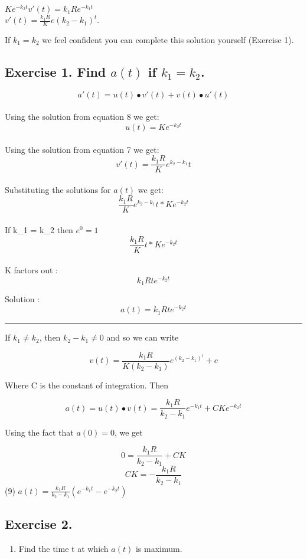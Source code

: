 \documentclass[]{article}
\providecommand{\tightlist}{%
  \setlength{\itemsep}{0pt}\setlength{\parskip}{0pt}}
\begin{document}
\(Ke^{-k_2t}v'(t) = k_1Re^{-k_1t}\)\\
\(v'(t) = \frac{k_1R}{K}e(k_2-k_1)^t\).

If \(k_1 = k_2\) we feel confident you can complete this solution
yourself (Exercise 1).

\subsection{\texorpdfstring{Exercise 1. Find \(a(t)\) if
\(k_1 = k_2\).}{Exercise 1. Find a(t) if k\_1 = k\_2.}}\label{exercise-1.-find-at-if-k_1-k_2.}

\[a'(t) = u(t) \bullet v'(t) + v(t) \bullet u'(t)\]\\
Using the solution from equation 8 we get: \[u(t) = Ke^{-k_2t}\]\\
Using the solution from equation 7 we get:
\[v'(t) = \frac{k_1R}{K}e^{k_2 - k_1}t\]\\
Substituting the solutions for \(a(t)\) we get:
\[\frac{k_1R}{K}e^{k_2 - k_1}t * Ke^{-k_2t}\]\\
If k\_1 = k\_2 then \(e^{0} = 1\)\\
\[\frac{k_1R}{K}t * Ke^{-k_2t}\]\\
K factors out : \[k_1Rte^{-k_2t}\]

Solution : \[a(t) = k_1Rte^{-k_2t}\]

\begin{center}\rule{0.5\linewidth}{\linethickness}\end{center}

If \(k_1 \neq k_2\), then \(k_2 - k _1 \neq 0\) and so we can write

\[v(t) = \frac{k_1R}{K(k_2 - k_1)}e^(k_2 -k_1)^t +c\]

Where C is the constant of integration. Then

\[a(t) = u(t) \bullet v(t) = \frac{k_1R}{k_2-k_1}e^{-k_1t} + CKe^{-k_2t}\]

Using the fact that \(a(0) = 0\), we get

\[0 = \frac{k_1R}{k_2-k_1} + CK\] \[CK = -\frac{k_1R}{k_2-k_1}\] (9)
\(a(t) = \frac{k_1R}{k_2-k_1}(e^{-k_1t} - e^{-k_2t})\)

\subsection{Exercise 2.}\label{exercise-2.}

\begin{enumerate}
\def\labelenumi{(\alph{enumi})}
\tightlist
\item
  Find the time t at which \(a(t)\) is maximum.
\end{enumerate}
\end{document}

